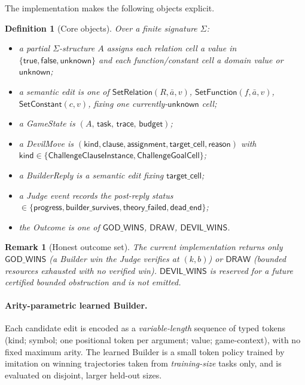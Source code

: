 \documentclass[11pt]{article}
\newtheorem{definition}{Definition}[section]
\newtheorem{remark}{Remark}[section]
\begin{document}
The implementation makes the following objects explicit.
\begin{definition}[Core objects]\label{def:objects}
Over a finite signature \(\Sigma\):
\begin{itemize}[leftmargin=2em]
  \item a \emph{partial \(\Sigma\)-structure} \(A\) assigns each relation cell a value in \(\{\mathsf{true},\mathsf{false},\mathsf{unknown}\}\) and each function/constant cell a domain value or \(\mathsf{unknown}\);
  \item a \emph{semantic edit} is one of \(\mathsf{SetRelation}(R,\bar a,v)\), \(\mathsf{SetFunction}(f,\bar a,v)\), \(\mathsf{SetConstant}(c,v)\), fixing one currently-\(\mathsf{unknown}\) cell;
  \item a \emph{GameState} is \((A,\,\mathsf{task},\,\mathsf{trace},\,\mathsf{budget})\);
  \item a \emph{DevilMove} is \((\mathsf{kind},\mathsf{clause},\mathsf{assignment},\mathsf{target\_cell},\mathsf{reason})\) with \(\mathsf{kind}\in\{\mathsf{ChallengeClauseInstance},\mathsf{ChallengeGoalCell}\}\);
  \item a \emph{BuilderReply} is a semantic edit fixing \(\mathsf{target\_cell}\);
  \item a \emph{Judge event} records the post-reply status \(\in\{\mathsf{progress},\mathsf{builder\_survives},\mathsf{theory\_failed},\mathsf{dead\_end}\}\);
  \item the \emph{Outcome} is one of \(\mathsf{GOD\_WINS}\), \(\mathsf{DRAW}\), \(\mathsf{DEVIL\_WINS}\).
\end{itemize}
\end{definition}

\begin{remark}[Honest outcome set]
The current implementation returns only \(\mathsf{GOD\_WINS}\) (a Builder win the Judge verifies at \((k,b)\)) or \(\mathsf{DRAW}\) (bounded resources exhausted with no verified win).  \(\mathsf{DEVIL\_WINS}\) is reserved for a future \emph{certified} bounded obstruction and is not emitted.
\end{remark}

\paragraph{Arity-parametric learned Builder.}
Each candidate edit is encoded as a \emph{variable-length} sequence of typed tokens (kind; symbol; one positional token per argument; value; game-context), with no fixed maximum arity.  The learned Builder is a small token policy trained by imitation on winning trajectories taken from \emph{training-size} tasks only, and is evaluated on disjoint, larger held-out sizes.
\end{document}
